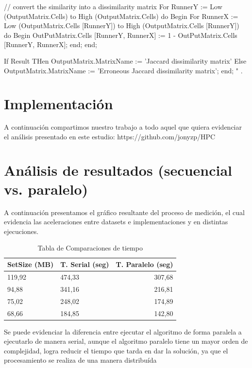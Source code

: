 \documentclass[fleqn,10pt]{SelfArx} %
\begin{document}
  // convert the similarity into a dissimilarity matrix
  For RunnerY := Low (OutputMatrix.Cells) to High (OutputMatrix.Cells) do
  Begin
    For RunnerX := Low (OutputMatrix.Cells [RunnerY]) to High (OutputMatrix.Cells [RunnerY]) do
    Begin
      OutPutMatrix.Cells [RunnerY, RunnerX] := 1 - OutPutMatrix.Cells [RunnerY, RunnerX];
    end;
  end;

  If Result THen OutputMatrix.MatrixName := 'Jaccard dissimilarity matrix'
            Else OutputMatrix.MatrixName := 'Erroneous Jaccard dissimilarity matrix';
end;
" \cite{jaccard_seudo}. 

\section{Implementación}

A continuación compartimos nuestro trabajo a todo aquel que quiera evidenciar el análisis presentado en este estudio: https://github.com/jonyzp/HPC

\section{Análisis de resultados (secuencial vs. paralelo)}

A continuación presentamos el gráfico resultante del proceso de medición, el cual evidencia las aceleraciones entre datasets e implementaciones y en distintas ejecuciones.

\begin{table}[hbt]
	\caption{Tabla de Comparaciones de tiempo}
	\centering
	\begin{tabular}{llr}
		\cmidrule(r){1-3}
		SetSize (MB) & T. Serial (seg) & T. Paralelo (seg)\\
		\midrule
		
		119,92 & 474,33 & 307,68 \\
		
		94,88 & 341,16 & 216,81 \\
		
		75,02 & 248,02 & 174,89 \\
		
		68,66 & 184,85 & 142,80 \\
		
		\bottomrule
	\end{tabular}
	\label{tab:label}
\end{table}


Se puede evidenciar la diferencia entre ejecutar el algoritmo de forma paralela a ejecutarlo de manera serial, aunque el algoritmo paralelo tiene un mayor orden de complejidad, logra reducir el tiempo que tarda en dar la solución, ya que el procesamiento se realiza de una manera distribuída
\end{document}
